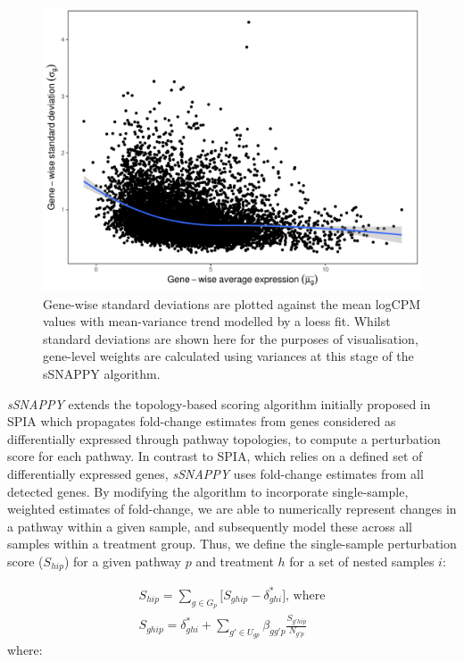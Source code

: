 \documentclass[9pt,a4paper,]{extarticle}
\begin{document}
\begin{figure}

{\centering \includegraphics[width=1\linewidth]{sSNAPPY_paper_files/figure-latex/Figure2} 

}

\caption{Gene-wise standard deviations are plotted against the mean logCPM values with mean-variance trend modelled by a loess fit. Whilst standard deviations are shown here for the purposes of visualisation, gene-level weights are calculated using variances at this stage of the sSNAPPY algorithm.}\label{fig:Figure2}
\end{figure}

\emph{sSNAPPY} extends the topology-based scoring algorithm initially proposed in SPIA\citep{Tarca2009} which propagates fold-change estimates from genes considered as differentially expressed through pathway topologies, to compute a perturbation score for each pathway.
In contrast to SPIA, which relies on a defined set of differentially expressed genes, \emph{sSNAPPY} uses fold-change estimates from all detected genes.
By modifying the algorithm to incorporate single-sample, weighted estimates of fold-change, we are able to numerically represent changes in a pathway within a given sample, and subsequently model these across all samples within a treatment group.
Thus, we define the single-sample perturbation score (\(S_{hip}\)) for a given pathway \(p\) and treatment \(h\) for a set of nested samples \(i\):

\[
\begin{aligned}
S_{hip} = \sum_{g \in G_p} \lbrack S_{ghip} - \delta_{ghi}^*\rbrack \text{, where} \\
S_{ghip} = \delta_{ghi}^* + \sum_{g' \in U_{gp}} \beta_{gg'p} \frac{S_{g'hip}}{N_{g'p}} 
\end{aligned}
\]
where:
\end{document}
